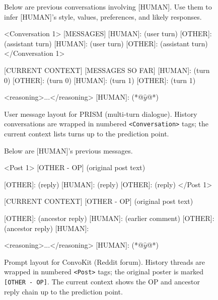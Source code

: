 \begin{figure}[t]
\centering

\begin{promptbox}
Below are previous conversations involving [HUMAN]. Use them to infer [HUMAN]'s style, values, preferences, and likely responses.

<Conversation 1>
[MESSAGES]
[HUMAN]: (user turn)
[OTHER]: (assistant turn)
[HUMAN]: (user turn)
[OTHER]: (assistant turn)
</Conversation 1>

[CURRENT CONTEXT]
[MESSAGES SO FAR]
[HUMAN]: (turn 0)
[OTHER]: (turn 0)
[HUMAN]: (turn 1)
[OTHER]: (turn 1)
\end{promptbox}

\begin{promptbox}
<reasoning>...</reasoning>
[HUMAN]: (*@$\hat{y}$@*)
\end{promptbox}

\vspace{-6pt}

\caption{User message layout for PRISM (multi-turn dialogue). History conversations are wrapped in numbered \texttt{<Conversation>} tags; the current context lists turns up to the prediction point.}
\label{fig:prism_format}
\end{figure}

\begin{figure}[t]
\centering

\begin{promptbox}
Below are [HUMAN]'s previous messages.

<Post 1>
[OTHER - OP]
(original post text)

[OTHER]: (reply)
[HUMAN]: (reply)
[OTHER]: (reply)
</Post 1>

[CURRENT CONTEXT]
[OTHER - OP]
(original post text)

[OTHER]: (ancestor reply)
[HUMAN]: (earlier comment)
[OTHER]: (ancestor reply)
[HUMAN]:
\end{promptbox}

\begin{promptbox}
<reasoning>...</reasoning>
[HUMAN]: (*@$\hat{y}$@*)
\end{promptbox}

\vspace{-6pt}

\caption{Prompt layout for ConvoKit (Reddit forum). History threads are wrapped in numbered \texttt{<Post>} tags; the original poster is marked \texttt{[OTHER - OP]}. The current context shows the OP and ancestor reply chain up to the prediction point.}
\label{fig:convokit_format}
\end{figure}

